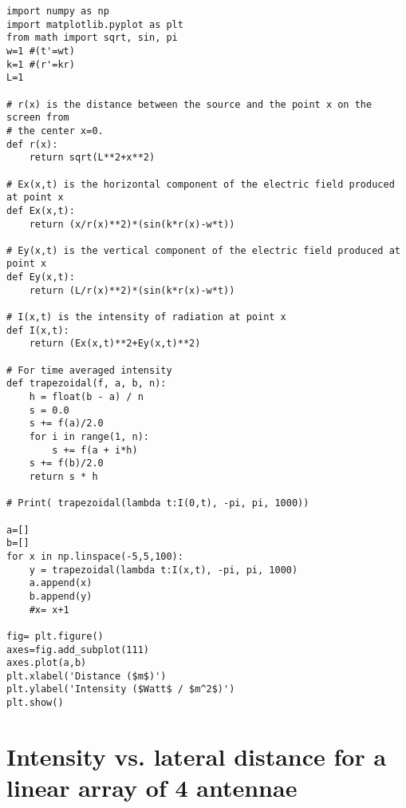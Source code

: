 \begin{Verbatim}[fontsize=\small,baselinestretch=0.9]
import numpy as np
import matplotlib.pyplot as plt
from math import sqrt, sin, pi
w=1 #(t'=wt)
k=1 #(r'=kr)
L=1

# r(x) is the distance between the source and the point x on the screen from 
# the center x=0.
def r(x):
    return sqrt(L**2+x**2)

# Ex(x,t) is the horizontal component of the electric field produced at point x
def Ex(x,t):
    return (x/r(x)**2)*(sin(k*r(x)-w*t))

# Ey(x,t) is the vertical component of the electric field produced at point x
def Ey(x,t):
    return (L/r(x)**2)*(sin(k*r(x)-w*t))

# I(x,t) is the intensity of radiation at point x
def I(x,t):
    return (Ex(x,t)**2+Ey(x,t)**2)

# For time averaged intensity
def trapezoidal(f, a, b, n):
    h = float(b - a) / n
    s = 0.0
    s += f(a)/2.0
    for i in range(1, n):
        s += f(a + i*h)
    s += f(b)/2.0
    return s * h

# Print( trapezoidal(lambda t:I(0,t), -pi, pi, 1000))

a=[]
b=[]
for x in np.linspace(-5,5,100):
    y = trapezoidal(lambda t:I(x,t), -pi, pi, 1000)
    a.append(x)
    b.append(y)
    #x= x+1

fig= plt.figure()
axes=fig.add_subplot(111)
axes.plot(a,b)
plt.xlabel('Distance ($m$)')
plt.ylabel('Intensity ($Watt$ / $m^2$)')
plt.show()
\end{Verbatim}


\section{Intensity vs. lateral distance for a linear array of 4 antennae}\label{code:four}

